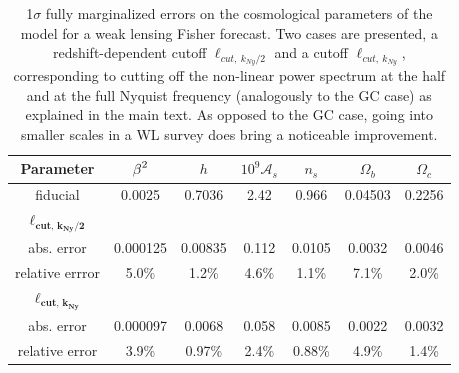 \begin{table}
\centering{}%
\begin{tabular}{|c|c|c|c|c|c|c|}
\hline 
\textbf{Parameter}  & \textbf{$\text{\ensuremath{\beta}}^{2}$}  & $h$  & $10^{9}\mathcal{A}_{s}$  & $n_{s}$  & $\Omega_{b}$  & $\Omega_{c}$\tabularnewline
\hline 
fiducial  & 0.0025  & 0.7036  & 2.42  & 0.966  & 0.04503  & 0.2256\tabularnewline
\hline 
\textbf{$\mathbf{\boldsymbol{\ell}}_{\mathbf{cut,\, k_{Ny}/2}}$}  &  &  &  &  &  & \tabularnewline
\hline 
abs. error  & 0.000125  & 0.00835  & 0.112  & 0.0105  & 0.0032  & 0.0046\tabularnewline
relative errror & 5.0\%  & 1.2\%  & 4.6\%  & 1.1\%  & 7.1\%  & 2.0\%\tabularnewline
\hline 
\textbf{$\boldsymbol{\ell}_{\mathbf{cut,\, k_{Ny}}}$}  &  &  &  &  &  & \tabularnewline
\hline 
abs. error  & 0.000097  & 0.0068  & 0.058  & 0.0085  & 0.0022  & 0.0032\tabularnewline
relative error & 3.9\%  & 0.97\%  & 2.4\%  & 0.88\%  & 4.9\%  & 1.4\%\tabularnewline
\hline 
\end{tabular}
\protect\protect\caption[1$\sigma$ fully marginalized
errors for a WL
Fisher forecast with Euclid in CDE.]{\label{tab:1-sigmaerrors-nl-WL-full} 
1$\sigma$ fully marginalized
errors on the cosmological parameters of the model for a weak lensing
Fisher forecast. Two cases are presented, a redshift-dependent cutoff
$\ell_{cut,\: k_{Ny}/2}$ and a cutoff $\ell_{cut,\: k_{Ny}}$, corresponding
to cutting off the non-linear power spectrum at the half and at the
full Nyquist frequency (analogously to the GC case) as explained in
the main text. As opposed to the GC case, going into smaller scales
in a WL survey does bring a noticeable improvement. }
\end{table}


